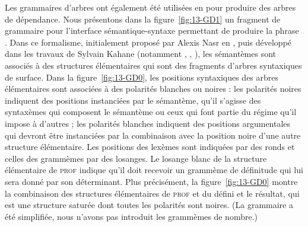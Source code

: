 {Les grammaires d’arbres ont également été utilisées en  pour produire des arbres de dépendance. Nous présentons dans la figure~\ref{fig:13-GD1} un fragment de grammaire pour l’interface sémantique-syntaxe permettant de produire la phrase . Dans ce formalisme, initialement proposé par Alexis Nasr en \citeyear{nasr1995formalism}, puis développé dans les travaux de Sylvain Kahane (notamment \citealt{kahane2002grammaire}, \citealt{kahane2005gust}, \citealt{kahane2015trois}), les sémantèmes sont associés à des structures élémentaires qui sont des fragments d’arbres syntaxiques de surface. Dans la figure~\ref{fig:13-GD0}, les positions syntaxiques des arbres élémentaires sont associées à des polarités blanches ou noires : les polarités noires indiquent des positions instanciées par le sémantème, qu’il s’agisse des syntaxèmes qui composent le sémantème ou ceux qui font partie du régime qu’il impose à d’autres ; les polarités blanches indiquent des positions argumentales qui devront être instanciées par la combinaison avec la position noire d’une autre structure élémentaire. Les positions des lexèmes sont indiquées par des ronds et celles des grammèmes par des losanges. Le losange blanc de la structure élémentaire de \textsc{prof} indique qu’il doit recevoir un grammème de définitude qui lui sera donné par son déterminant. Plus précisément, la figure~\ref{fig:13-GD0} montre la combinaison des structures élémentaires de \textsc{prof} et du défini et le résultat, qui est une structure saturée dont toutes les polarités sont noires. (La grammaire a été simplifiée, nous n’avons pas introduit les grammèmes de nombre.)

\begin{figure}[H]
\end{figure}}
